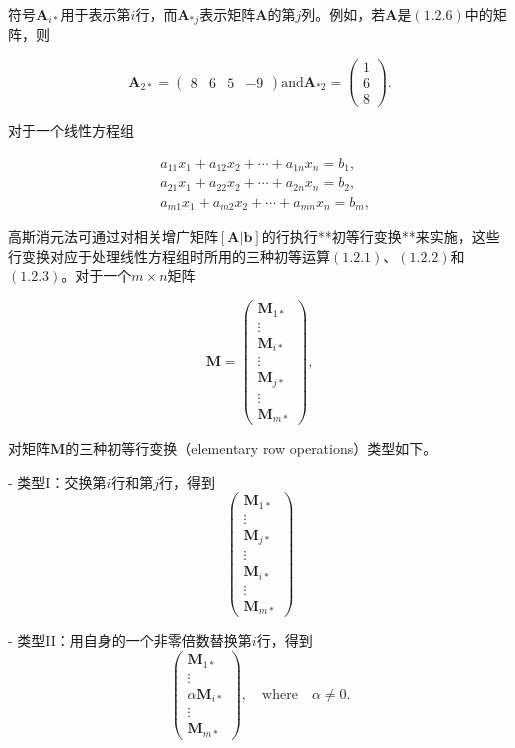 符号\(\mathbf{A}_{i*}\)用于表示第\( i \)行，而\(\mathbf{A}_{*j}\)表示矩阵\(\mathbf{A}\)的第\( j \)列。例如，若\(\mathbf{A}\)是\((1.2.6)\)中的矩阵，则

\[\mathbf{A}_{2*}=\begin{pmatrix}8&6&5&-9\end{pmatrix} \mathrm{and} \mathbf{A}_{*2}=\begin{pmatrix}1\\6\\8\end{pmatrix}.\]

对于一个线性方程组

\[\begin{aligned}&a_{11}x_1+a_{12}x_2+\cdots+a_{1n}x_n=b_1,\\&a_{21}x_1+a_{22}x_2+\cdots+a_{2n}x_n=b_2,\\&a_{m1}x_1+a_{m2}x_2+\cdots+a_{mn}x_n=b_m,\end{aligned}\]

高斯消元法可通过对相关增广矩阵\([\mathbf{A}|\mathbf{b}]\)的行执行**初等行变换**来实施，这些行变换对应于处理线性方程组时所用的三种初等运算\((1.2.1)\)、\((1.2.2)\)和\((1.2.3)\)。对于一个\( m \times n \)矩阵

\[\mathbf{M}=\begin{pmatrix}\mathbf{M}_{1*}\\\vdots\\\mathbf{M}_{i*}\\\vdots\\\mathbf{M}_{j*}\\\vdots\\\mathbf{M}_{m*}\end{pmatrix},\]

对矩阵\(\mathbf{M}\)的三种\(\boxed{\text{初等行变换}}\)（elementary row operations）类型如下。

- 类型I：交换第\( i \)行和第\( j \)行，得到
\[
\begin{pmatrix}
	\mathbf{M}_{1*} \\
	\vdots \\
	\mathbf{M}_{j*} \\
	\vdots \\
	\mathbf{M}_{i*} \\
	\vdots \\
	\mathbf{M}_{m*}
\end{pmatrix}
\tag{1.2.7}
\]

- 类型II：用自身的一个非零倍数替换第\( i \)行，得到
\[
\begin{pmatrix}
	\mathbf{M}_{1*} \\
	\vdots \\
	\alpha\mathbf{M}_{i*} \\
	\vdots \\
	\mathbf{M}_{m*}
\end{pmatrix}, \quad \text{where} \quad \alpha \neq 0.
\tag{1.2.8}
\]

